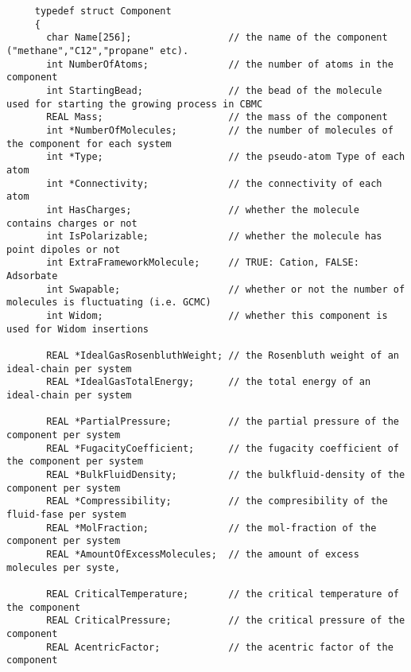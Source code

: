 \begin{footnotesize}
\begin{verbatim}
     typedef struct Component
     {
       char Name[256];                 // the name of the component ("methane","C12","propane" etc).
       int NumberOfAtoms;              // the number of atoms in the component
       int StartingBead;               // the bead of the molecule used for starting the growing process in CBMC
       REAL Mass;                      // the mass of the component
       int *NumberOfMolecules;         // the number of molecules of the component for each system
       int *Type;                      // the pseudo-atom Type of each atom
       int *Connectivity;              // the connectivity of each atom
       int HasCharges;                 // whether the molecule contains charges or not
       int IsPolarizable;              // whether the molecule has point dipoles or not
       int ExtraFrameworkMolecule;     // TRUE: Cation, FALSE: Adsorbate
       int Swapable;                   // whether or not the number of molecules is fluctuating (i.e. GCMC)
       int Widom;                      // whether this component is used for Widom insertions

       REAL *IdealGasRosenbluthWeight; // the Rosenbluth weight of an ideal-chain per system
       REAL *IdealGasTotalEnergy;      // the total energy of an ideal-chain per system

       REAL *PartialPressure;          // the partial pressure of the component per system
       REAL *FugacityCoefficient;      // the fugacity coefficient of the component per system
       REAL *BulkFluidDensity;         // the bulkfluid-density of the component per system
       REAL *Compressibility;          // the compresibility of the fluid-fase per system
       REAL *MolFraction;              // the mol-fraction of the component per system
       REAL *AmountOfExcessMolecules;  // the amount of excess molecules per syste,

       REAL CriticalTemperature;       // the critical temperature of the component
       REAL CriticalPressure;          // the critical pressure of the component
       REAL AcentricFactor;            // the acentric factor of the component


\end{verbatim}
\end{footnotesize}
